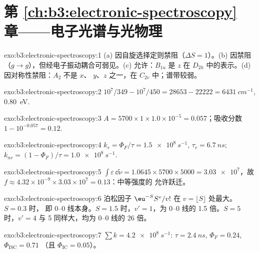 \section*{第 \ref{ch:b3:electronic-spectroscopy} 章——电子光谱与光物理}

\begin{solution}{exo:b3:electronic-spectroscopy:1}
(a) 因自旋选择定则禁阻（$\Delta S = 1$）。(b) 因禁阻
（$g \to g$），但经电子振动耦合可弱见。(c) 允许：$B_{1u}$ 是
$z$ 在 $D_{2h}$ 中的表示。(d) 因对称性禁阻：$A_2$ 不是 $x$、
$y$、$z$ 之一，在 $C_{2v}$ 中；谱带较弱。
\end{solution}

\begin{solution}{exo:b3:electronic-spectroscopy:2}
$10^7/349 - 10^7/450 = 28653 - 22222 = \qty{6431}{cm^{-1}}$, \qty{0.80}{eV}.
\end{solution}

\begin{solution}{exo:b3:electronic-spectroscopy:3}
$A = 5700 \times 1 \times 1.0\times10^{-5} = 0.057$；吸收分数 $1 - 10^{-0.057} =
0.12$.
\end{solution}

\begin{solution}{exo:b3:electronic-spectroscopy:4}
$k_r = \Phi_F/\tau = \qty{1.5e8}{s^{-1}}$, $\tau_r = \qty{6.7}{ns}$; $k_{nr} = (1 - \Phi_F)/\tau
= \qty{1.0e8}{s^{-1}}$.
\end{solution}

\begin{solution}{exo:b3:electronic-spectroscopy:5}
$\int\varepsilon\,\dd\tilde\nu = 1.0645 \times 5700 \times 5000 = \num{3.03e7}$，故 $f \approx
4.32\times10^{-9} \times 3.03\times10^7 = 0.13$：中等强度的
允许跃迁。
\end{solution}

\begin{solution}{exo:b3:electronic-spectroscopy:6}
泊松因子 $\eu^{-S}S^v/v!$ 在 $v = \lfloor S\rfloor$ 处最大。$S = 0.3$ 时，
即 0--0 线本身。$S = 1.5$ 时，$v' = 1$，为 0--0 线的 1.5 倍。$S = 5$ 时，$v' = 4$
与 5 同样大，均为 0--0 线的 26 倍。
\end{solution}

\begin{solution}{exo:b3:electronic-spectroscopy:7}
$\sum k = \qty{4.2e8}{s^{-1}}$: $\tau = \qty{2.4}{ns}$, $\Phi_F = 0.24$, $\Phi_{\mathrm{ISC}} = 0.71$
（且 $\Phi_{\mathrm{IC}} = 0.05$）。
\end{solution}

